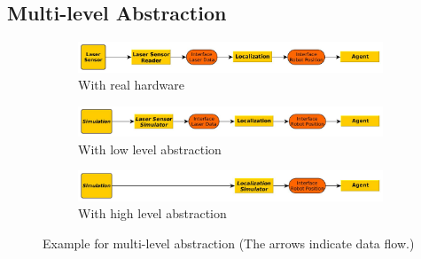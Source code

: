 \subsection{Multi-level Abstraction}
\label{sec:architecture_mla}
\begin{figure}
  \centering
  \begin{subfigure}[b]{\textwidth}
    \includegraphics[width=\textwidth]{tabs/mla_hardware}
    \caption{With real hardware}
    \label{fig:mla_hardware}
  \end{subfigure}
  \begin{subfigure}[b]{\textwidth}
    \includegraphics[width=\textwidth]{tabs/mla_sim_low}
    \caption{With low level abstraction}
    \label{fig:mla_sim_low}
  \end{subfigure}
  \begin{subfigure}[b]{\textwidth}
    \includegraphics[width=\textwidth]{tabs/mla_sim_high}
    \caption{With high level abstraction}
    \label{fig:mla_sim_high}
  \end{subfigure}
  \caption[Example for multi-level abstraction]{Example for multi-level abstraction (The arrows indicate data flow.)}
  \label{fig:mla}
  
\end{figure}
